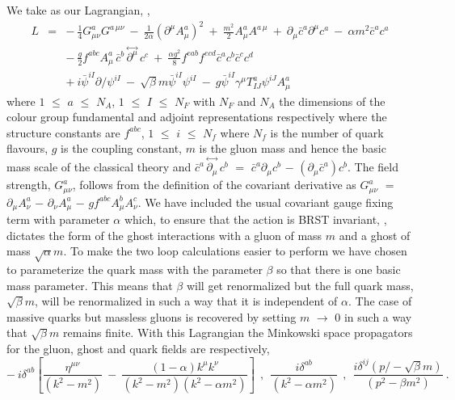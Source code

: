 \documentclass[a4paper,11pt]{article}
\newcommand{\pslash}{p \! \! \! /}
\newcommand{\partialslash}{\partial \! \! \! /}
\newcommand{\Nf}{N_{\!f}}
\begin{document}
We take as our Lagrangian, \cite{4,6},  
\begin{eqnarray} 
L &=& -~ \frac{1}{4} G_{\mu\nu}^a G^{a \, \mu\nu} ~-~ \frac{1}{2\alpha} 
(\partial^\mu A^a_\mu)^2 ~+~ \frac{m^2}{2} A_\mu^a A^{a \, \mu} ~+~ 
\partial_\mu \bar{c}^a \partial^\mu c^a ~-~ \alpha m^2 \bar{c}^a c^a 
\nonumber \\
&& -~ \frac{g}{2} f^{abc} A^a_\mu \, \bar{c}^b \, {\stackrel \leftrightarrow 
{\partial^\mu} } \, c^c ~+~ \frac{\alpha g^2}{8} f^{eab} f^{ecd} \bar{c}^a c^b 
\bar{c}^c c^d \nonumber \\ 
&& +~ i \bar{\psi}^{iI} \partialslash \psi^{iI} ~-~ \sqrt{\beta} m 
\bar{\psi}^{iI} \psi^{iI} ~-~ g \bar{\psi}^{iI} \gamma^\mu T^a_{IJ} \psi^{iJ} 
A^a_\mu 
\label{lag}
\end{eqnarray}  
where $1$ $\leq$ $a$ $\leq$ $N_A$, $1$ $\leq$ $I$ $\leq$ $N_F$ with $N_F$ and
$N_A$ the dimensions of the colour group fundamental and adjoint 
representations respectively where the structure constants are $f^{abc}$, $1$ 
$\leq$ $i$ $\leq$ $\Nf$ where $\Nf$ is the number of quark flavours, $g$ is the
coupling constant, $m$ is the gluon mass and hence the basic mass scale of the 
classical theory and $\bar{c}^a \, {\stackrel \leftrightarrow {\partial_\mu} } 
\, c^b$ $=$ $\bar{c}^a \partial_\mu c^b$ $-$ $(\partial_\mu \bar{c}^a) c^b$. 
The field strength, $G^a_{\mu\nu}$, follows from the definition of the 
covariant derivative as $G^a_{\mu\nu}$ $=$ $\partial_\mu A^a_\nu$ $-$ 
$\partial_\nu A^a_\mu$ $-$ $g f^{abc} A^b_\mu A^c_\nu$. We have included the 
usual covariant gauge fixing term with parameter $\alpha$ which, to ensure that
the action is BRST invariant, \cite{4,6,8,10}, dictates the form of the ghost 
interactions with a gluon of mass $m$ and a ghost of mass $\sqrt{\alpha} m$. To
make the two loop calculations easier to perform we have chosen to parameterize 
the quark mass with the parameter $\beta$ so that there is one basic mass 
parameter. This means that $\beta$ will get renormalized but the full quark 
mass, $\sqrt{\beta} m$, will be renormalized in such a way that it is 
independent of $\alpha$. The case of massive quarks but massless gluons is 
recovered by setting $m$ $\rightarrow$ $0$ in such a way that $\sqrt{\beta} m$ 
remains finite. With this Lagrangian the Minkowski space propagators for the 
gluon, ghost and quark fields are respectively,  
\begin{equation}
-~ i \delta^{ab} \left[ \frac{\eta^{\mu\nu}}{(k^2-m^2)} ~-~ 
\frac{(1-\alpha)k^\mu k^\nu}{(k^2-m^2)(k^2-\alpha m^2)} \right] ~~,~~ 
\frac{i\delta^{ab}}{(k^2-\alpha m^2)} ~~,~~ 
\frac{i\delta^{ij}(\pslash-\sqrt{\beta}m)}{(p^2-\beta m^2)} ~.  
\label{propdefn} 
\end{equation} 
\end{document}
